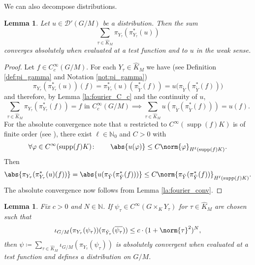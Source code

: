 \documentclass[JEP,XML,SOM,NoFloatCountersInSection,Unicode,published]{cedram}
\newtheorem{lemma}[theorem]{Lemma}
\theoremstyle{definition}
\DeclarePairedDelimiter{\abs}\lvert\rvert
\DeclarePairedDelimiter{\norm}\lVert\rVert
\newcommand{\fourier}[1]{\ensuremath{\sum_{\tau\in\hat K_M}\pi_{Y_\tau}(\pi_{Y_\tau}^*(#1))}}
\newcommand{\mc}[1]{\ensuremath{\mathcal{#1}}}
\newcommand{\on}[1]{\ensuremath{\operatorname{#1}}}
\newcommand{\N}{\ensuremath{\mathbb{N}}}
\begin{document}
We can also decompose distributions.
\begin{lemma}\label{la:distribution_decomp}
Let $u\in\mc D'(G/M)$ be a distribution. Then the sum
\[
\fourier{u}
\]
converges absolutely when evaluated at a test function and to $u$ in the weak sense.
\end{lemma}

\begin{proof}
Let $f\in C_c^\infty(G/M)$. For each $Y_\tau\in\hat K_M$ we have (see Definition \ref{def:pi_gamma} and Notation \ref{not:pi_gamma})
\[
\pi_{Y_\tau}(\pi_{Y_\tau}^*(u))(f)=\pi_{Y_\tau}^*(u)(\pi_{\tilde Y}^*(f))=u\bigl(\pi_{\tilde Y}(\pi_{\tilde Y}^*(f))\bigr)
\]
and therefore, by Lemma \ref{la:fourier_C_c} and the continuity of $u$,
\[
\sum_{\tau\in\hat K_M}\pi_{Y_\tau}(\pi_{Y_\tau}^*(f))=f\text{ in }C_c^\infty(G/M)\implies\sum_{\tau\in\hat K_M}u(\pi_{\tilde Y}(\pi_{\tilde Y}^*(f)))=u(f).
\]
For the absolute convergence note that $u$ restricted to $C^\infty(\on{supp}(f)K)$ is of finite order (see \cite[Def.\,2.1.1]{H90}), \ie there exist $\ell\in\N_0$ and $C>0$ with
\[
\forall \varphi\in C^\infty(\on{supp}(f)K)\colon\qquad\abs{u(\varphi)}\leq C\norm{\varphi}_{H^\ell(\on{supp}(f)K)}.
\]
Then
\[
\abs{\pi_{Y_\tau}(\pi_{Y_\tau}^*(u)(f))}=\abs{u(\pi_{\tilde Y}(\pi_{\tilde Y}^*(f)))}\leq C\norm{\pi_{\tilde Y}(\pi_{\tilde Y}^*(f))}_{H^\ell(\on{supp}(f)K)}.
\]
The absolute convergence now follows from Lemma \ref{la:fourier_conv}.
\end{proof}

\begin{lemma}\label{la:def_distr}
Fix $c>0$ and $N\in\N$. If $\psi_\tau\in C^\infty(G\times_KY_\tau)$ for $\tau\in\hat K_M$ are chosen such that
\[
\iota_{G/M}(\pi_{Y_\tau}(\psi_{\tau}))(\pi_{\tilde Y_\tau}(\overline{\psi_{\tau}}) )\leq c\cdot(1+\norm{\tau}^2)^N,
\]
then $\psi\coloneqq\sum_{\tau\in\hat K_M}\iota_{G/M}(\pi_{Y_\tau}(\psi_\tau))$ is absolutely convergent when evaluated at a test function and defines a distribution on $G/M$.
\end{lemma}
\end{document}
